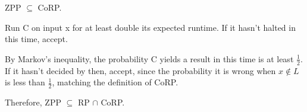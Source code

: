 \documentclass{article}
\begin{document}
\medskip
ZPP $\subseteq$ CoRP.

Run C on input x for at least double its expected runtime.  If it hasn't halted in this time, accept.

By Markov's inequality, the probability C yields a result in this time is at least $\frac12$.  If it hasn't decided by then, accept, since the probability it is wrong when $x\notin L$ is less than $\frac12$, matching the definition of CoRP.

\bigskip
Therefore, ZPP $\subseteq$ RP $\cap$ CoRP.
\end{document}
